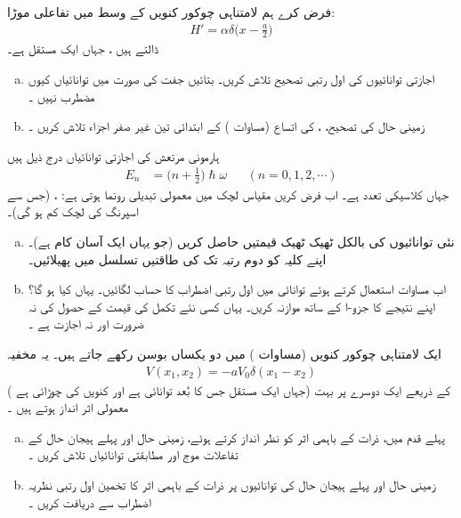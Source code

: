  
فرض کرے ہم لامتناہی چوکور کنویں کے وسط میں  تفاعلی موڑا:
\begin{align*}
H' = \alpha \delta \big(x - \frac{a}{2}\big)
\end{align*}
 ڈالتے ہیں ، جہاں  ایک مستقل ہے۔ 
\begin{enumerate}[a.]
\item
 اجازتی توانائیوں کی اول رتبی تصحیح تلاش کریں۔ بتائیں   جفت  کی صورت میں توانائیاں کیوں  مضطرب  نہیں   ۔
\item
 زمینی حال کی  تصحیح، ،  کی اتساع    (مساوات )   کے    ابتدائی تین غیر صفر اجزاء تلاش کریں  ۔
 \end{enumerate}
ہارمونی مرتعش   کی اجازتی توانائیاں درج ذیل ہیں 
\begin{align*}
E_n &= \big(n + \frac{1}{2}\big) \hslash \omega  && (n = 0, 1, 2, \cdots )
\end{align*}
جہاں  کلاسیکی تعدد ہے۔  اب فرض کریں  مقیاس لچک میں معمولی تبدیلی رونما ہوتی ہے: ، (جس سے اسپرنگ کی لچک کم ہو گی)۔
\begin{enumerate}[a.]
\item
 نئی  توانائیوں کی بالکل ٹھیک ٹھیک قیمتیں  حاصل  کریں  (جو یہاں ایک آسان کام ہے)۔ اپنے  کلیہ کو دوم رتبہ تک  کی طاقتیں تسلسل میں پھیلائیں۔ 
\item
 اب مساوات   استعمال کرتے ہوئے توانائی میں اول رتبی اضطراب کا حساب لگائیں۔ یہاں  کیا  ہو گا؟  اپنے نتیجے کا جزو-ا کے ساتھ موازنہ کریں۔  یہاں کسی نئے تکمل کی قیمت کے حصول کی نہ ضرورت اور نہ اجازت ہے ۔
 \end{enumerate}
ایک لامتناہی چوکور کنویں (مساوات  )   میں دو یکساں بوسن رکھے جاتے ہیں۔ یہ مخفیہ 
\begin{align*}
V(x_1, x_2) = -aV_0\delta (x_1 - x_2)
\end{align*}
( جہاں  ایک مستقل   جس کا بُعد توانائی ہے  اور  کنویں کی چوڑائی ہے)  کے ذریعے ایک دوسرے پر بہت معمولی اثر انداز ہوتے ہیں ۔
\begin{enumerate}[a.]
\item
 پہلے قدم میں،  ذرات کے باہمی   اثر  کو نظر انداز کرتے ہوئے، زمینی حال اور پہلے ہیجان حال کے تفاعلات موج اور مطابقتی توانائیاں تلاش کریں ۔
\item
 زمینی حال اور پہلے    ہیجان  حال کی  توانائیوں پر ذرات کے باہمی  اثر کا تخمین اول رتبی نظریہ اضطراب سے دریافت کریں ۔
 \end{enumerate}



